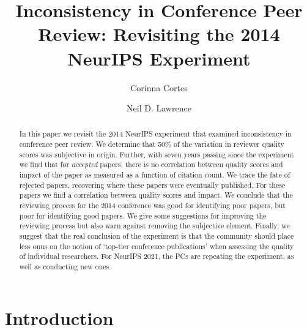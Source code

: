 \documentclass[twoside]{article}
\title{Inconsistency in Conference Peer Review: Revisiting the 2014 NeurIPS Experiment}
\author[$\star$]{Corinna Cortes}
\author[$\dagger$]{Neil D. Lawrence}
\affil[$\star$]{Google Research, New York}
\affil[$\dagger$]{Computer Lab, University of Cambridge}
\begin{document}
\maketitle

%

%

%

\begin{abstract}
    In this paper we revisit the 2014 NeurIPS experiment that examined
inconsistency in conference peer review. We determine that 50\% of the variation
in reviewer quality scores was subjective in origin. Further, with seven years
passing since the experiment we find that for \emph{accepted} papers,
there is no correlation between quality scores and impact of the paper
as measured as a function of citation count. We trace the fate of
rejected papers, recovering where these papers were eventually
published. For these papers we find a correlation between quality scores
and impact. We conclude that the reviewing process for the 2014
conference was good for identifying poor papers, but poor for
identifying good papers. We give some suggestions for improving the
reviewing process but also warn against removing the subjective element.
Finally, we suggest that the real conclusion of the experiment is that
the community should place less onus on the notion of `top-tier
conference publications' when assessing the quality of individual
researchers. For NeurIPS 2021, the PCs are repeating the experiment, as well as conducting new ones.
\end{abstract}

\hypertarget{introduction}{%
\section{Introduction}\label{introduction}}
\end{document}
